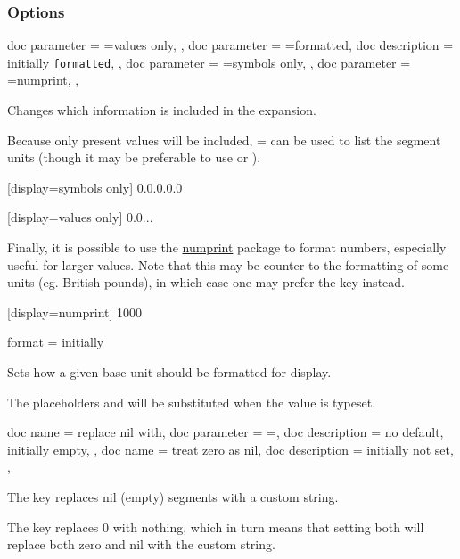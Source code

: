 \documentclass[
	a4paper,
	margin=4cm
]{article}
\begin{document}
\clearpage
\subsubsection{Options}
	
\begin{docKeys}[
		doc name = display,
	]{
		{
			doc parameter = {=values only},
		},
		{
			doc parameter = {=formatted},
			doc description = initially \texttt{formatted},
		},
		{
			doc parameter = {=symbols only},
		},
		{
			doc parameter = {=numprint},
		},
	}

	Changes which information is included in the expansion.

	Because only present values will be included, = can be used to list the segment units (though it may be preferable to use  or ).

\begin{dispExample}
	[display=symbols only]
	{0.0.0.0.0}

	[display=values only]
	{0.0...}
\end{dispExample}
	
	Finally, it is possible to use the \href{https://ctan.org/pkg/numprint}{numprint} package to format numbers, especially useful for larger values. Note that this may be counter to the formatting of some units (eg. British pounds), in which case one may prefer the  key instead.

\begin{dispExample}
	[display=numprint]
	{1000}
\end{dispExample}
\end{docKeys}

\begin{docKey}
	{format}
	{=}
	{initially }

	Sets how a given base unit should be formatted for display.
	
	The placeholders  and  will be substituted when the value is typeset.
\end{docKey}

\begin{docKeys}
	[]
	{
		{
			doc name = replace nil with,
			doc parameter = {=},
			doc description = {no default, initially empty},
		},
		{
			doc name = treat zero as nil,
			doc description = {initially not set},
		},
	}

The key  replaces nil (empty) segments with a custom string.

The key  replaces 0 with nothing, which in turn means that setting both will replace both zero and nil with the custom string.

\end{docKeys}
\end{document}

